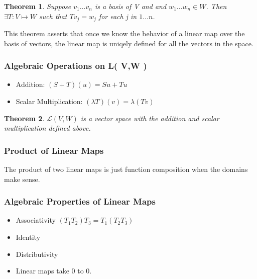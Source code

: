 \documentclass{article}
\newtheorem{mytheorem}{Theorem}
\begin{document}
\begin{mytheorem} 
Suppose \( v_1 \ldots v_n \) is a basis of V and and \( w_1 \ldots w_n  \in W  \). Then \(  \exists T : V \mapsto W   \) such that \( Tv_j = w_j    \) for each j in \( 1 \ldots n \).

\end{mytheorem}

This theorem asserts that once we know the behavior of a linear map over the basis of vectors, the linear map is uniqely defined for all the vectors in the space.

\subsubsection{Algebraic Operations on L( V,W ) }

\begin{itemize}

\item Addition: \(  (S+T) (u) =  Su + Tu     \)

\item Scalar Multiplication: \(  ( \lambda T  ) (v)  = \lambda (Tv)    \)


\end{itemize}

\begin{mytheorem}
\(  \mathcal{L} (V,W)  \) is a vector space with the addition and scalar multiplication defined above.
\end{mytheorem}

\subsubsection{Product of Linear Maps}
The product of two linear maps is just function composition when the domains make sense.

\subsubsection{Algebraic Properties of Linear Maps}

\begin{itemize}

\item Associativity \(  (T_1 T_2 )  T_3  = T_1 (T_2 T_3)    \)

\item Identity \(     \)

\item Distributivity

\item Linear maps take 0 to 0.

\end{itemize}
\end{document}
